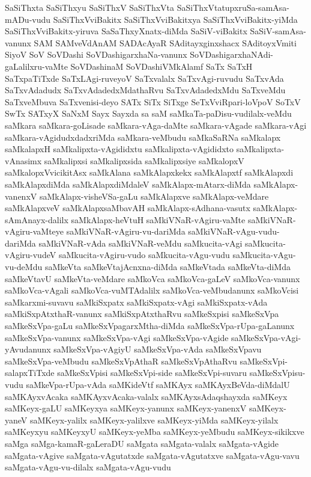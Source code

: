 {SaSiThxta
SaSiThxyu
SaSiThxV
SaSiThxVta
SaSiThxVtatupxruSa-samAsa-mADu-vudu
SaSiThxVviBakitx
SaSiThxVviBakitxya
SaSiThxVviBakitx-yiMda
SaSiThxVviBakitx-yiruva
SaSaThxyXnatx-diMda
SaSiV-viBakitx
SaSiV-samAsa-vanunx
SAM
SAMveVdAnAM
SADAcAyaR
SAditayxginxshacx
SAditoyxVmiti
SiyoV
SoV
SoVDashi
SoVDashigarxhaNa-vanunx
SoVDashigarxhaNAdi-gaLalilxru-vaMte
SoVDashinaM
SoVDashiVMkAlamf
SaTx
SaTxH
SaTxpaTiTxde
SaTxLAgi-ruveyoV
SaTxvalalx
SaTxvAgi-ruvudu
SaTxvAda
SaTxvAdadudx
SaTxvAdadedxMdathaRvu
SaTxvAdadedxMdu
SaTxveMdu
SaTxveMbuva
SaTxvenisi-deyo
SATx
SiTx
SiTxge
SeTxVviRpari-loVpoV
SoTxV
SwTx
SATxyX
SaNxM
Sayx
Sayxda
sa
saM
saMkaTa-paDisu-vudilalx-veMdu
saMkara
saMkara-goLisade
saMkara-vAga-daMte
saMkara-vAgade
saMkara-vAgi
saMkara-vAgidudxdadxriMda
saMkara-veMbudu
saMkaSaRNa
saMkalapx
saMkalapxH
saMkalipxta-vAgididxtu
saMkalipxta-vAgididxto
saMkalipxta-vAnasimx
saMkalipxsi
saMkalipxsida
saMkalipxsiye
saMkalopxV
saMkalopxVvicikitAsx
saMkAlana
saMkAlapxkekx
saMkAlapxtf
saMkAlapxdi
saMkAlapxdiMda
saMkAlapxdiMdaleV
saMkAlapx-mAtarx-diMda
saMkAlapx-vanenxV
saMkAlapx-visheVSa-gaLu
saMkAlapxve
saMkAlapx-veMdare
saMkAlapxveV
saMkAlapxsaMbavAH
saMkAlapx-sAdhana-vasutx
saMkAlapx-sAmAnayx-dalilx
saMkAlapx-heVtuH
saMkiVNaR-vAgiru-vaMte
saMkiVNaR-vAgiru-vaMteye
saMkiVNaR-vAgiru-vu-dariMda
saMkiVNaR-vAgu-vudu-dariMda
saMkiVNaR-vAda
saMkiVNaR-veMdu
saMkucita-vAgi
saMkucita-vAgiru-vudeV
saMkucita-vAgiru-vudo
saMkucita-vAgu-vudu
saMkucita-vAgu-vu-deMdu
saMkeVta
saMkeVtajAcnxna-diMda
saMkeVtada
saMkeVta-diMda
saMkeVtavU
saMkeVta-veMdare
saMkoVca
saMkoVca-gaLeV
saMkoVca-vanunx
saMkoVca-vAgali
saMkoVca-vuMTAdalilx
saMkoVca-veMbudanunx
saMkoVcisi
saMkarxmi-suvavu
saMkiSxpatx
saMkiSxpatx-vAgi
saMkiSxpatx-vAda
saMkiSxpAtxthaR-vanunx
saMkiSxpAtxthaRvu
saMkeSxpisi
saMkeSxVpa
saMkeSxVpa-gaLu
saMkeSxVpagarxMtha-diMda
saMkeSxVpa-rUpa-gaLanunx
saMkeSxVpa-vanunx
saMkeSxVpa-vAgi
saMkeSxVpa-vAgide
saMkeSxVpa-vAgi-yAvudanunx
saMkeSxVpa-vAgiyU
saMkeSxVpa-vAda
saMkeSxVpavu
saMkeSxVpa-veMbudu
saMkeSxVpAthaR
saMkeSxVpAthaRvu
saMkeSxVpi-salapxTiTxde
saMkeSxVpisi
saMkeSxVpi-side
saMkeSxVpi-suvaru
saMkeSxVpisu-vudu
saMkeVpa-rUpa-vAda
saMKideVtf
saMKAyx
saMKAyxBeVda-diMdalU
saMKAyxvAcaka
saMKAyxvAcaka-valalx
saMKAyxsAdaqshayxda
saMKeyx
saMKeyx-gaLU
saMKeyxya
saMKeyx-yanunx
saMKeyx-yanenxV
saMKeyx-yaneV
saMKeyx-yalilx
saMKeyx-yalilxve
saMKeyx-yiMda
saMKeyx-yilalx
saMKeyxyu
saMKeyxyU
saMKeyx-yeMba
saMKeyx-yeMbudu
saMKeyx-sikikxve
saMga
saMga-kamaR-gaLeraDU
saMgata
saMgata-valalx
saMgata-vAgide
saMgata-vAgive
saMgata-vAgutatxde
saMgata-vAgutatxve
saMgata-vAgu-vavu
saMgata-vAgu-vu-dilalx
saMgata-vAgu-vudu
}
